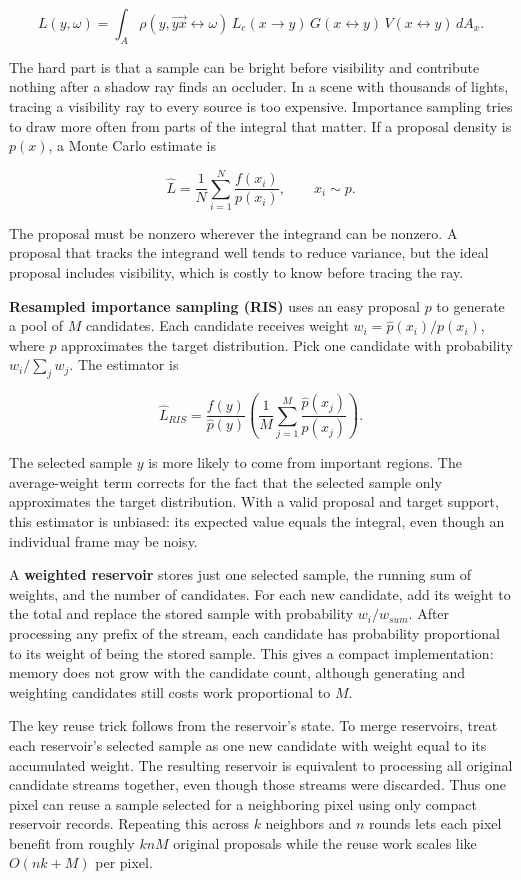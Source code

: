 \[L(y,\omega)=\int_A \rho(y,\overrightarrow{yx}\leftrightarrow\omega)\,L_e(x\to y)\,G(x\leftrightarrow y)\,V(x\leftrightarrow y)\,dA_x.\]

The hard part is that a sample can be bright before visibility and contribute nothing after a shadow ray finds an occluder. In a scene with thousands of lights, tracing a visibility ray to every source is too expensive. Importance sampling tries to draw more often from parts of the integral that matter. If a proposal density is \(p(x)\), a Monte Carlo estimate is

\[\widehat L=\frac{1}{N}\sum_{i=1}^N\frac{f(x_i)}{p(x_i)},\qquad x_i\sim p.\]

The proposal must be nonzero wherever the integrand can be nonzero. A proposal that tracks the integrand well tends to reduce variance, but the ideal proposal includes visibility, which is costly to know before tracing the ray.

\textbf{Resampled importance sampling (RIS)} uses an easy proposal \(p\) to generate a pool of \(M\) candidates. Each candidate receives weight \(w_i=\widehat p(x_i)/p(x_i)\), where \(\widehat p\) approximates the target distribution. Pick one candidate with probability \(w_i/\sum_jw_j\). The estimator is

\[\widehat L_{RIS}=\frac{f(y)}{\widehat p(y)}\left(\frac{1}{M}\sum_{j=1}^M\frac{\widehat p(x_j)}{p(x_j)}\right).\]

The selected sample \(y\) is more likely to come from important regions. The average-weight term corrects for the fact that the selected sample only approximates the target distribution. With a valid proposal and target support, this estimator is unbiased: its expected value equals the integral, even though an individual frame may be noisy.

A \textbf{weighted reservoir} stores just one selected sample, the running sum of weights, and the number of candidates. For each new candidate, add its weight to the total and replace the stored sample with probability \(w_i/w_{sum}\). After processing any prefix of the stream, each candidate has probability proportional to its weight of being the stored sample. This gives a compact implementation: memory does not grow with the candidate count, although generating and weighting candidates still costs work proportional to \(M\).

The key reuse trick follows from the reservoir's state. To merge reservoirs, treat each reservoir's selected sample as one new candidate with weight equal to its accumulated weight. The resulting reservoir is equivalent to processing all original candidate streams together, even though those streams were discarded. Thus one pixel can reuse a sample selected for a neighboring pixel using only compact reservoir records. Repeating this across \(k\) neighbors and \(n\) rounds lets each pixel benefit from roughly \(knM\) original proposals while the reuse work scales like \(O(nk+M)\) per pixel.

